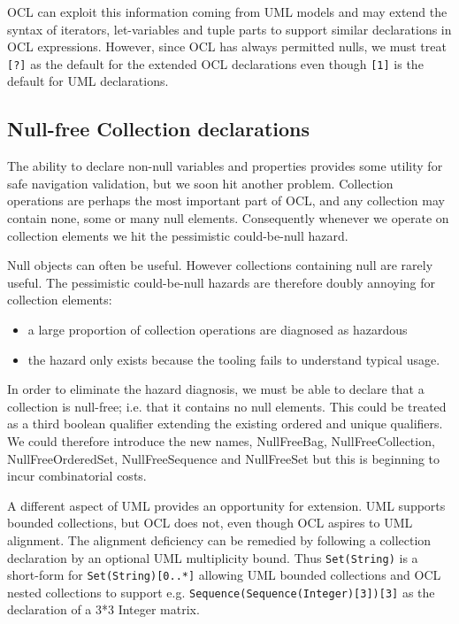 \documentclass{llncs}
\begin{document}
OCL can exploit this information coming from UML models and may extend the syntax of iterators, let-variables and tuple parts to support similar declarations in OCL expressions. However, since OCL has always permitted nulls, we must treat \verb|[?]| as the default for the extended OCL declarations even though \verb|[1]| is the default for UML declarations.

\subsection{Null-free Collection declarations}

The ability to declare non-null variables and properties provides some utility for safe navigation validation, but we soon hit another problem. Collection operations are perhaps the most important part of OCL, and any collection may contain none, some or many null elements. Consequently whenever we operate on collection elements we hit the pessimistic could-be-null hazard.

Null objects can often be useful. However collections containing null are rarely useful. The pessimistic could-be-null hazards are therefore doubly annoying for collection elements:
\begin{itemize}
\item a large proportion of collection operations are diagnosed as hazardous
\item the hazard only exists because the tooling fails to understand typical usage.
\end{itemize}

In order to eliminate the hazard diagnosis, we must be able to declare that a collection is null-free; i.e. that it contains no null elements. This could be treated as a third boolean qualifier extending the existing ordered and unique qualifiers. We could therefore introduce the new names, NullFreeBag, NullFreeCollection, NullFreeOrderedSet, NullFreeSequence and NullFreeSet but this is beginning to incur combinatorial costs.

A different aspect of UML provides an opportunity for extension. UML supports bounded collections, but OCL does not, even though OCL aspires to UML alignment. The alignment deficiency can be remedied by following a collection declaration by an optional UML multiplicity bound. Thus \verb|Set(String)| is a short-form for \verb|Set(String)[0..*]| allowing UML bounded collections and OCL nested collections to support e.g. \verb|Sequence(Sequence(Integer)[3])[3]| as the declaration of a 3*3 Integer matrix.
\end{document}
